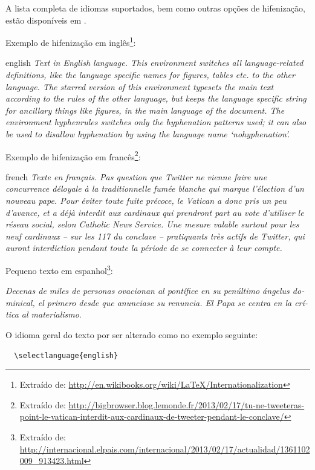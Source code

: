 \documentclass[12pt,oneside,a4paper,chapter=TITLE,english,brazil]{abntex2}
\begin{document}
\begin{anexosenv}
A lista completa de idiomas suportados, bem como outras opções de hifenização, estão disponíveis em .

Exemplo de hifenização em inglês\footnote{Extraído de: \url{http://en.wikibooks.org/wiki/LaTeX/Internationalization}}:

\begin{otherlanguage*}{english}
\textit{Text in English language. This environment switches all language-related definitions, like the language specific names for figures, tables etc. to the other language. The starred version of this environment typesets the main text according to the rules of the other language, but keeps the language specific string for ancillary things like figures, in the main language of the document. The environment hyphenrules switches only the hyphenation patterns used; it can also be used to disallow hyphenation by using the language name `nohyphenation'.}
\end{otherlanguage*}

Exemplo de hifenização em francês\footnote{Extraído de: \url{http://bigbrowser.blog.lemonde.fr/2013/02/17/tu-ne-tweeteras-point-le-vatican-interdit-aux-cardinaux-de-tweeter-pendant-le-conclave/}}:

\begin{otherlanguage*}{french}
\textit{Texte en français. Pas question que Twitter ne vienne faire une concurrence déloyale à la traditionnelle fumée blanche qui marque l'élection d'un nouveau pape. Pour éviter toute fuite précoce, le Vatican a donc pris un peu d'avance, et a déjà interdit aux cardinaux qui prendront part au vote d'utiliser le réseau social, selon Catholic News Service. Une mesure valable surtout pour les neuf cardinaux – sur les 117 du conclave – pratiquants très actifs de Twitter, qui auront interdiction pendant toute la période de se connecter à leur compte.}
\end{otherlanguage*}

Pequeno texto em espanhol\footnote{Extraído de: \url{http://internacional.elpais.com/internacional/2013/02/17/actualidad/1361102009_913423.html}}:

\foreignlanguage{spanish}{\textit{Decenas de miles de personas ovacionan al pontífice en su penúltimo ángelus dominical, el primero desde que anunciase su renuncia. El Papa se centra en la crítica al materialismo}}.

O idioma geral do texto por ser alterado como no exemplo seguinte:
\begin{verbatim}
  \selectlanguage{english}
\end{verbatim}


\end{anexosenv}
\end{document}

